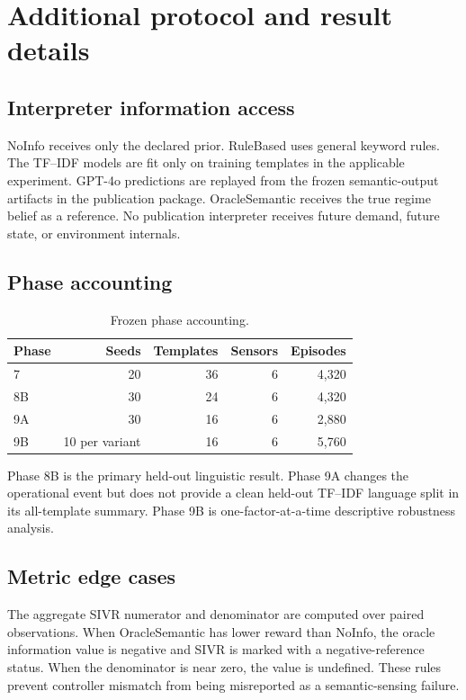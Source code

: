 \section{Additional protocol and result details}

\subsection{Interpreter information access}

NoInfo receives only the declared prior. RuleBased uses general keyword rules.
The TF--IDF models are fit only on training templates in the applicable
experiment. GPT-4o predictions are replayed from the frozen semantic-output
artifacts in the publication package. OracleSemantic receives the true regime
belief as a reference. No publication interpreter receives future demand,
future state, or environment internals.

\subsection{Phase accounting}

\begin{table}[h]
\caption{Frozen phase accounting.}
\centering
\small
\begin{tabular}{lrrrr}
\toprule
Phase & Seeds & Templates & Sensors & Episodes \\
\midrule
7 & 20 & 36 & 6 & 4,320 \\
8B & 30 & 24 & 6 & 4,320 \\
9A & 30 & 16 & 6 & 2,880 \\
9B & 10 per variant & 16 & 6 & 5,760 \\
\bottomrule
\end{tabular}
\end{table}

Phase 8B is the primary held-out linguistic result. Phase 9A changes the
operational event but does not provide a clean held-out TF--IDF language split
in its all-template summary. Phase 9B is one-factor-at-a-time descriptive
robustness analysis.

\subsection{Metric edge cases}

The aggregate SIVR numerator and denominator are computed over paired
observations. When OracleSemantic has lower reward than NoInfo, the oracle
information value is negative and SIVR is marked with a negative-reference
status. When the denominator is near zero, the value is undefined. These rules
prevent controller mismatch from being misreported as a semantic-sensing
failure.

